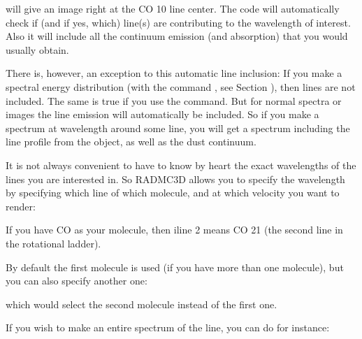 \documentclass[letterpaper,10pt,english]{sphinxmanual}
\begin{document}
will give an image right at the CO 1\sphinxhyphen{}0 line center. The code will automatically
check if (and if yes, which) line(s) are contributing to the wavelength of
interest. Also it will include all the continuum emission (and absorption) that
you would usually obtain.

There is, however, an exception to this automatic line inclusion: If you make a
spectral energy distribution (with the command , see Section
{\hyperref[\detokenize{imagesspectra:sec-making-spectra}]{}}), then lines are not included. The same is true if you
use the  command.  But for normal spectra or images the line
emission will automatically be included.  So if you make a spectrum at
wavelength around some line, you will get a spectrum including the line profile
from the object, as well as the dust continuum.

It is not always convenient to have to know by heart the exact wavelengths
of the lines you are interested in. So RADMC\sphinxhyphen{}3D allows you to specify the
wavelength by specifying which line of which molecule, and at which velocity
you want to render:

\begin{sphinxVerbatim}[commandchars=\\\{\}]
     
\end{sphinxVerbatim}

If you have CO as your molecule, then iline 2 means CO 2\sphinxhyphen{}1 (the second
line in the rotational ladder).

By default the first molecule is used (if you have more than one molecule),
but you can also specify another one:

\begin{sphinxVerbatim}[commandchars=\\\{\}]
       
\end{sphinxVerbatim}

which would select the second molecule instead of the first one.

If you wish to make an entire spectrum of the line, you can do for instance:

\begin{sphinxVerbatim}[commandchars=\\\{\}]
     
\end{sphinxVerbatim}
\end{document}
